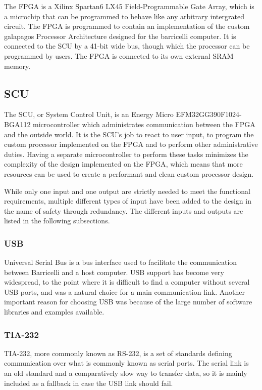 The \gls{FPGA} is a Xilinx Spartan6 LX45 Field-Programmable Gate Array, which is a microchip that can be programmed to behave like any arbitrary intergrated circuit.
The \gls{FPGA} is programmed to contain an implementation of the custom \Gls{galapagos} Processor Architecture designed for the \Gls{barricelli} computer.
It is connected to the \gls{SCU} by a 41-bit wide bus, though which the processor can be programmed by users.
The \gls{FPGA} is connected to its own external \gls{SRAM} memory.

\subsection{\gls{SCU}}

The \gls{SCU}, or System Control Unit, is an Energy Micro EFM32GG390F1024-BGA112 microcontroller which administrates communication between the \gls{FPGA} and the outside world.
It is the \gls{SCU}'s job to react to user input, to program the custom processor implemented on the \gls{FPGA} and to perform other administrative duties.
Having a separate microcontroller to perform these tasks minimizes the complexity of the design implemented on the \gls{FPGA}, which means that more resources can be used to create a performant and clean custom processor design.

While only one input and one output are strictly needed to meet the functional requirements, multiple different types of input have been added to the design in the name of safety through redundancy.
The different inputs and outputs are listed in the following subsections.

\subsubsection{USB}

Universal Serial Bus is a bus interface used to facilitate the communication between Barricelli and a host computer.
USB support has become very widespread, to the point where it is difficult to find a computer without several USB ports, and was a natural choice for a main communication link.
Another important reason for choosing USB was because of the large number of software libraries and examples available.

\subsubsection{TIA-232}

TIA-232, more commonly known as RS-232, is a set of standards defining communication over what is commonly known as serial ports.
The serial link is an old standard and a comparatively slow way to transfer data, so it is mainly included as a fallback in case the USB link should fail.

